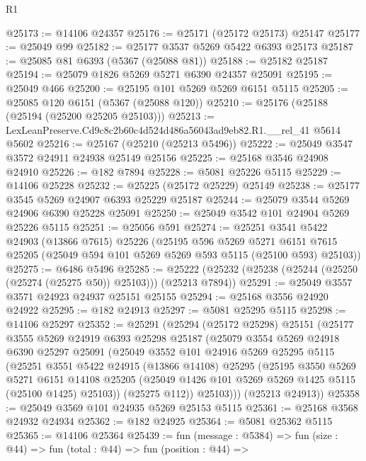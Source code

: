 \begin{lexlean}{R1}
\begin{coremodule}
@25173 := @14106 @24357
@25176 := @25171 (@25172 @25173) @25147
@25177 := @25049 @99
@25182 := @25177 @3537 @5269 @5422 @6393 @25173
@25187 := @25085 @81 @6393 (@5367 (@25088 @81))
@25188 := @25182 @25187
@25194 := @25079 @1826 @5269 @5271 @6390 @24357 @25091
@25195 := @25049 @466
@25200 := @25195 @101 @5269 @5269 @6151 @5115
@25205 := @25085 @120 @6151 (@5367 (@25088 @120))
@25210 := @25176 (@25188 (@25194 (@25200 @25205 @25103)))
@25213 := LexLeanPreserve.Cd9c8c2b60c4d524d486a56043ad9eb82.R1.__rel_41 @5614 @5602
@25216 := @25167 (@25210 (@25213 @5496))
@25222 := @25049 @3547 @3572 @24911 @24938 @25149 @25156
@25225 := @25168 @3546 @24908 @24910
@25226 := @182 @7894
@25228 := @5081 @25226 @5115
@25229 := @14106 @25228
@25232 := @25225 (@25172 @25229) @25149
@25238 := @25177 @3545 @5269 @24907 @6393 @25229 @25187
@25244 := @25079 @3544 @5269 @24906 @6390 @25228 @25091
@25250 := @25049 @3542 @101 @24904 @5269 @25226 @5115
@25251 := @25056 @591
@25274 := @25251
    @3541
    @5422
    @24903
    (@13866 @7615)
    @25226
    (@25195
      @596
      @5269
      @5271
      @6151
      @7615
      @25205
      (@25049 @594 @101 @5269 @5269 @593 @5115 (@25100 @593) @25103))
@25275 := @6486 @5496
@25285 := @25222 (@25232 (@25238 (@25244 (@25250 (@25274 (@25275 @50)) @25103))) (@25213 @7894))
@25291 := @25049 @3557 @3571 @24923 @24937 @25151 @25155
@25294 := @25168 @3556 @24920 @24922
@25295 := @182 @24913
@25297 := @5081 @25295 @5115
@25298 := @14106 @25297
@25352 := @25291
    (@25294
      (@25172 @25298)
      @25151
      (@25177
        @3555
        @5269
        @24919
        @6393
        @25298
        @25187
        (@25079
          @3554
          @5269
          @24918
          @6390
          @25297
          @25091
          (@25049
            @3552
            @101
            @24916
            @5269
            @25295
            @5115
            (@25251
              @3551
              @5422
              @24915
              (@13866 @14108)
              @25295
              (@25195
                @3550
                @5269
                @5271
                @6151
                @14108
                @25205
                (@25049 @1426 @101 @5269 @5269 @1425 @5115 (@25100 @1425) @25103))
              (@25275 @112))
            @25103)))
      (@25213 @24913))
@25358 := @25049 @3569 @101 @24935 @5269 @25153 @5115
@25361 := @25168 @3568 @24932 @24934
@25362 := @182 @24925
@25364 := @5081 @25362 @5115
@25365 := @14106 @25364
@25439 := fun (message : @5384) =>
  fun (size : @44) =>
  fun (total : @44) =>
  fun (position : @44) =>

\end{coremodule}
\end{lexlean}
